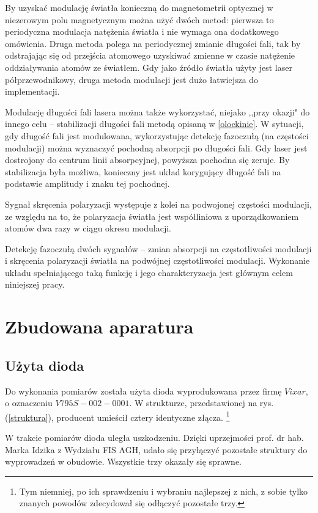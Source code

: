 \documentclass[a4paper,10pt,twoside]{report}
\begin{document}
By uzyskać modulację światła konieczną do magnetometrii optycznej w niezerowym polu magnetycznym można użyć dwóch metod: pierwsza to periodyczna modulacja natężenia światła i nie wymaga ona dodatkowego omówienia. Druga metoda polega na periodycznej zmianie długości fali, tak by odstrajając się od przejścia atomowego uzyskiwać zmienne w czasie natężenie oddziaływania atomów ze światłem. Gdy jako źródło światła użyty jest laser półprzewodnikowy, druga metoda modulacji jest dużo łatwiejsza do implementacji.

Modulację długości fali lasera można także wykorzystać, niejako  ,,przy okazji" do innego celu -- stabilizacji długości fali metodą opisaną w \ref{olockinie}. W sytuacji, gdy długość fali jest modulowana, wykorzystując detekcję fazoczułą (na częstości modulacji) można wyznaczyć pochodną absorpcji po długości fali.
Gdy laser jest dostrojony do centrum linii absorpcyjnej, powyższa pochodna się zeruje. By stabilizacja była możliwa, konieczny jest układ korygujący długość fali na podstawie amplitudy i znaku tej pochodnej.

Sygnał skręcenia polaryzacji występuje z kolei na podwojonej częstości modulacji, ze względu na to, że polaryzacja światła jest współliniowa z uporządkowaniem atomów dwa razy w ciągu okresu modulacji.

Detekcję fazoczułą dwóch sygnałów -- zmian absorpcji na częstotliwości modulacji i skręcenia polaryzacji światła na podwójnej częstotliwości modulacji. Wykonanie układu spełniającego taką funkcję i jego charakteryzacja jest głównym celem niniejszej pracy.




\chapter{Zbudowana aparatura}
\label{ch:aparatura}
\section{Użyta dioda}


Do wykonania pomiarów została użyta dioda wyprodukowana przez firmę $Vixar$, o oznaczeniu $V795S-002-0001$.
W strukturze, przedstawionej na rys. (\ref{struktura}), producent umieścił cztery identyczne złącza. \footnote{Tym niemniej, po ich sprawdzeniu i wybraniu najlepszej z nich, z sobie tylko znanych powodów zdecydował się odłączyć pozostałe trzy.}

W trakcie pomiarów dioda uległa uszkodzeniu. Dzięki uprzejmości prof. dr hab. Marka Idzika z Wydziału FIS AGH, udało się przyłączyć pozostałe struktury do wyprowadzeń w obudowie.
Wszystkie trzy okazały się sprawne.
\end{document}
